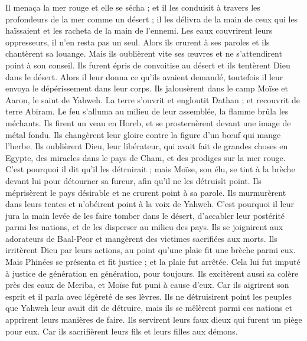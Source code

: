\begin{multicols}{2}
Il menaça la mer rouge et elle se sécha ; et il les conduisit à travers les profondeurs de la mer comme un désert ;
il les délivra de la main de ceux qui les haïssaient et les racheta de la main de l'ennemi.
Les eaux couvrirent leurs oppresseurs, il n'en resta pas un seul.
Alors ils crurent à ses paroles et ils chantèrent sa louange.
Mais ils oublièrent vite ses œuvres et ne s'attendirent point à son conseil.
Ils furent épris de convoitise au désert et ils tentèrent Dieu dans le désert.
Alors il leur donna ce qu'ils avaient demandé, toutefois il leur envoya le dépérissement dans leur corps.
Ils jalousèrent dans le camp Moïse et Aaron, le saint de Yahweh.
La terre s'ouvrit et engloutit Dathan ; et recouvrit de terre Abiram.
Le feu s'alluma au milieu de leur assemblée, la flamme brûla les méchants.
Ils firent un veau en Horeb, et se prosternèrent devant une image de métal fondu.
Ils changèrent leur gloire contre la figure d’un bœuf qui mange l'herbe.
Ils oublièrent Dieu, leur libérateur, qui avait fait de grandes choses en Egypte,
des miracles dans le pays de Cham, et des prodiges sur la mer rouge.
C'est pourquoi il dit qu'il les détruirait ; mais Moïse, son élu, se tint à la brèche devant lui pour détourner sa fureur, afin qu'il ne les détruisît point.
Ils méprisèrent le pays désirable et ne crurent point à sa parole.
Ils murmurèrent dans leurs tentes et n'obéirent point à la voix de Yahweh.
C'est pourquoi il leur jura la main levée de les faire tomber dans le désert,
d’accabler leur postérité parmi les nations, et de les disperser au milieu des pays.
Ils se joignirent aux adorateurs de Baal-Peor et mangèrent des victimes sacrifiées aux morts.
Ils irritèrent Dieu par leurs actions, au point qu'une plaie fit une brèche parmi eux.
Mais Phinées se présenta et fit justice ; et la plaie fut arrêtée.
Cela lui fut imputé à justice de génération en génération, pour toujours.
Ils excitèrent aussi sa colère près des eaux de Meriba, et Moïse fut puni à cause d'eux.
Car ils aigrirent son esprit et il parla avec légèreté de ses lèvres.
Ils ne détruisirent point les peuples que Yahweh leur avait dit de détruire,
mais ils se mêlèrent parmi ces nations et apprirent leurs manières de faire.
Ils servirent leurs faux dieux qui furent un piège pour eux.
Car ils sacrifièrent leurs fils et leurs filles aux démons.

\end{multicols}
